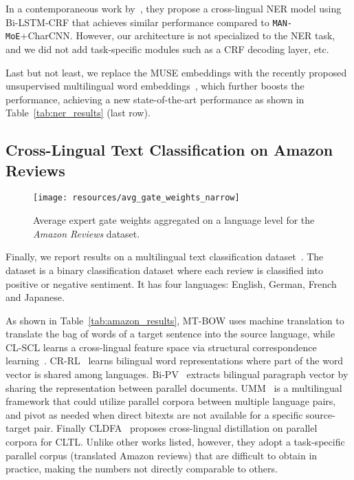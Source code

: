 \documentclass[11pt,a4paper]{article}
\newcommand{\manmoe}{\texttt{MAN-MoE}}
\begin{document}
In a contemporaneous work by~\citep{D18-1034}, they propose a cross-lingual NER model using Bi-LSTM-CRF that achieves similar performance compared to \manmoe{}+CharCNN.
However, our architecture is not specialized to the NER task, and we did not add task-specific modules such as a CRF decoding layer, etc.

Last but not least, we replace the MUSE embeddings with the recently proposed unsupervised multilingual word embeddings~\citep{chen2018umwe}, which further boosts the performance, achieving a new state-of-the-art performance as shown in Table~\ref{tab:ner_results} (last row).

\subsection{Cross-Lingual Text Classification on Amazon Reviews}\label{sec:exp:amazon}

\begin{figure}
    \centering
    \texttt{[image: resources/avg\_gate\_weights\_narrow]}
    \caption{Average expert gate weights aggregated on a language level for the \emph{Amazon Reviews} dataset.}
    \vspace{-3mm}
    \label{fig:avg_gate_weights}
\end{figure}
 
Finally, we report results on a multilingual text classification dataset~\cite{P10-1114}. The dataset is a binary classification dataset where each review is classified into positive or negative sentiment.
It has four languages: English, German, French and Japanese.

As shown in Table~\ref{tab:amazon_results}, MT-BOW uses machine translation to translate the bag of words of a target sentence into the source language, while CL-SCL learns a cross-lingual feature space via structural correspondence learning~\cite{P10-1114}.
CR-RL~\citep{D13-1153} learns bilingual word representations where part of the word vector is shared among languages.
Bi-PV~\citep{pham-luong-manning:2015:VSM-NLP} extracts bilingual paragraph vector by sharing the representation between parallel documents.
UMM~\citep{xu-wan:2017:EMNLP2017} is a multilingual framework that could utilize parallel corpora between multiple language pairs, and pivot as needed when direct bitexts are not available for a specific source-target pair.
Finally CLDFA~\citep{P17-1130} proposes cross-lingual distillation on parallel corpora for CLTL.
Unlike other works listed, however, they adopt a task-specific parallel corpus (translated Amazon reviews) that are difficult to obtain in practice, making the numbers not directly comparable to others.
\end{document}
